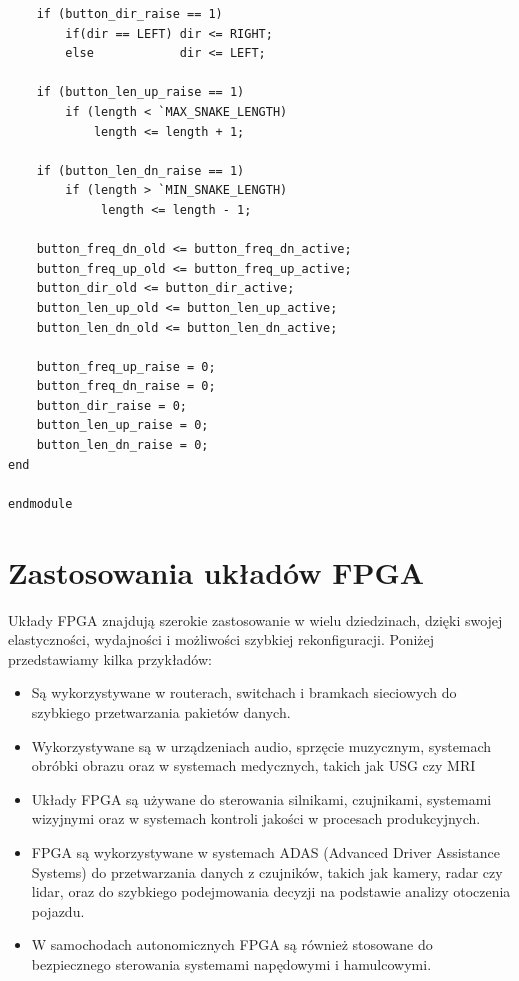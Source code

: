 \documentclass[a4paper]{article}
\begin{document}
\begin{verbatim}
    if (button_dir_raise == 1)
        if(dir == LEFT) dir <= RIGHT;
        else            dir <= LEFT;
    
    if (button_len_up_raise == 1)
        if (length < `MAX_SNAKE_LENGTH) 
            length <= length + 1;
            
    if (button_len_dn_raise == 1)
        if (length > `MIN_SNAKE_LENGTH) 
             length <= length - 1;
        
    button_freq_dn_old <= button_freq_dn_active;
    button_freq_up_old <= button_freq_up_active;
    button_dir_old <= button_dir_active;
    button_len_up_old <= button_len_up_active;
    button_len_dn_old <= button_len_dn_active;
        
    button_freq_up_raise = 0;
    button_freq_dn_raise = 0;
    button_dir_raise = 0;
    button_len_up_raise = 0;
    button_len_dn_raise = 0;
end

endmodule

\end{verbatim}

\pagebreak
\section{Zastosowania układów FPGA}
Układy FPGA znajdują szerokie zastosowanie w wielu dziedzinach,
dzięki swojej elastyczności, wydajności i możliwości szybkiej rekonfiguracji.
Poniżej przedstawiamy kilka przykładów:

\begin{itemize}
    \item Są wykorzystywane w routerach, switchach i bramkach sieciowych do szybkiego przetwarzania pakietów danych.
    \item Wykorzystywane są w urządzeniach audio, sprzęcie muzycznym, systemach obróbki obrazu oraz w systemach medycznych, takich jak USG czy MRI
    \item Układy FPGA są używane do sterowania silnikami, czujnikami, systemami wizyjnymi oraz w systemach kontroli jakości w procesach produkcyjnych.
    \item FPGA są wykorzystywane w systemach ADAS (Advanced Driver Assistance Systems) do przetwarzania danych z czujników, takich jak kamery, radar czy lidar, 
    oraz do szybkiego podejmowania decyzji na podstawie analizy otoczenia pojazdu.
    \item W samochodach autonomicznych FPGA są również stosowane do bezpiecznego sterowania systemami napędowymi i hamulcowymi.
\end{itemize}
\end{document}
